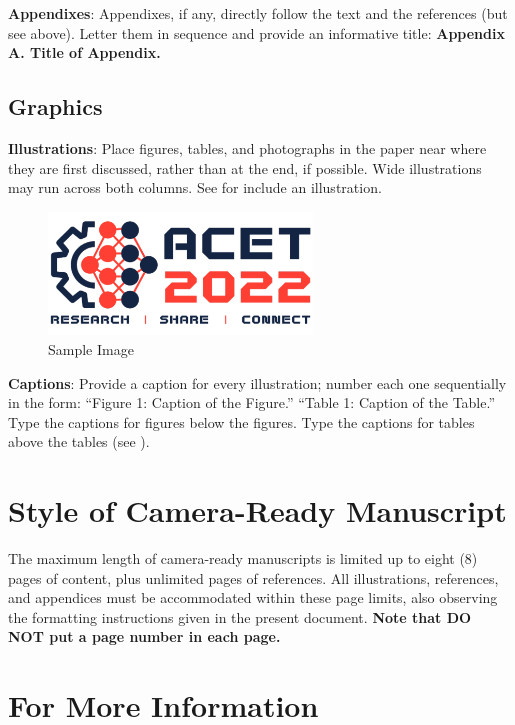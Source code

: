 \documentclass[11pt,a4paper]{article}
\begin{document}
{\bf Appendixes}: Appendixes, if any, directly follow the text and the
references (but see above).  Letter them in sequence and provide an
informative title: {\bf Appendix A. Title of Appendix.}

\subsection{Graphics}

{\bf Illustrations}: Place figures, tables, and photographs in the paper
near where they are first discussed, rather than at the end, if
possible.  Wide illustrations may run across both columns.  See
 for include an illustration.

\begin{figure}[ht]
\begin{center}
\includegraphics[width=7cm]{./fig/ACET_logo.pdf}
\caption{Sample Image} \label{sampleimg}
\end{center}
\end{figure} 

{\bf Captions}: Provide a caption for every illustration; number each
one sequentially in the form: ``Figure 1:  Caption of the Figure.''
``Table 1:  Caption of the Table.''  Type the captions for figures below
the figures.  Type the captions for tables above the tables (see
).


\section{Style of Camera-Ready Manuscript}

The maximum length of camera-ready manuscripts is limited up to eight (8) pages of content, plus unlimited pages of references. All illustrations, references, and appendices must be accommodated within these page limits, also observing the formatting instructions given in the present document.  {\bf Note that DO NOT put a page number in each page.}

\section{For More Information}
\end{document}
